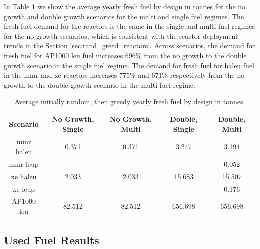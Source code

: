 In Table \ref{tab:rand_greed_fresh_avg} we show the average yearly fresh fuel by design in tonnes for the no growth and double growth scenarios for the multi and single fuel regimes. The fresh fuel demand for the reactors is the same in the single and multi fuel regimes for the no growth scenarios, which is consistent with the reactor deployment trends in the Section \ref{sec:rand_greed_reactors}. Across scenarios, the demand for fresh fuel for AP1000 \gls{leu} fuel increases 696\% from the no growth to the double growth scenario in the single fuel regime. The demand for fresh fuel for \gls{haleu} fuel in the \gls{mmr} and \gls{xe} reactors increases 775\% and 671\% respectively from the no growth to the double growth scenario in the multi fuel regime.

\begin{table}[H]
    \centering
    \caption{Average initially random, then greedy yearly fresh fuel by design in tonnes.}
    \label{tab:rand_greed_fresh_avg}
    \begin{tabular}{c c c c c}
       \hline
       Scenario & No Growth, Single & No Growth, Multi & Double, Single & Double, Multi  \\
       \hline
       \gls{mmr} \gls{haleu}   & 0.371    & 0.371   & 3.247    & 3.194    \\
       \gls{mmr} \gls{leup}    & --       & --      & --       & 0.052    \\
       \gls{xe} \gls{haleu}    & 2.033    & 2.033   & 15.683   & 15.507   \\
       \gls{xe} \gls{leup}     & --       & --      & --       & 0.176    \\
       AP1000 \gls{leu}        & 82.512   & 82.512  & 656.698  & 656.698  \\
       \hline
    \end{tabular}
\end{table}


\subsection{Used Fuel Results}
\label{sec:rand_greed_used}

